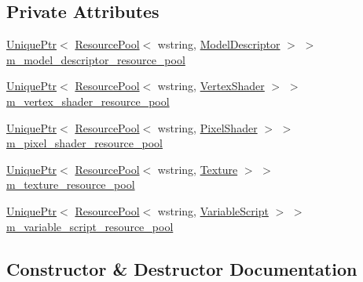 \subsection*{Private Attributes}
\begin{DoxyCompactItemize}
\item 
\hyperlink{namespacemage_a8c307fbcc33bce9b7f2aa4c26c3b95cf}{Unique\+Ptr}$<$ \hyperlink{classmage_1_1_resource_pool}{Resource\+Pool}$<$ wstring, \hyperlink{classmage_1_1_model_descriptor}{Model\+Descriptor} $>$ $>$ \hyperlink{classmage_1_1_resource_factory_a1739407c8918b375e7feaa2240628bde}{m\+\_\+model\+\_\+descriptor\+\_\+resource\+\_\+pool}
\item 
\hyperlink{namespacemage_a8c307fbcc33bce9b7f2aa4c26c3b95cf}{Unique\+Ptr}$<$ \hyperlink{classmage_1_1_resource_pool}{Resource\+Pool}$<$ wstring, \hyperlink{classmage_1_1_vertex_shader}{Vertex\+Shader} $>$ $>$ \hyperlink{classmage_1_1_resource_factory_a9f961cc4c47821c9fadbac05b9b88c07}{m\+\_\+vertex\+\_\+shader\+\_\+resource\+\_\+pool}
\item 
\hyperlink{namespacemage_a8c307fbcc33bce9b7f2aa4c26c3b95cf}{Unique\+Ptr}$<$ \hyperlink{classmage_1_1_resource_pool}{Resource\+Pool}$<$ wstring, \hyperlink{classmage_1_1_pixel_shader}{Pixel\+Shader} $>$ $>$ \hyperlink{classmage_1_1_resource_factory_a987af631d0fda02fd336ceb02113a128}{m\+\_\+pixel\+\_\+shader\+\_\+resource\+\_\+pool}
\item 
\hyperlink{namespacemage_a8c307fbcc33bce9b7f2aa4c26c3b95cf}{Unique\+Ptr}$<$ \hyperlink{classmage_1_1_resource_pool}{Resource\+Pool}$<$ wstring, \hyperlink{classmage_1_1_texture}{Texture} $>$ $>$ \hyperlink{classmage_1_1_resource_factory_a0bb6251c64ac1f5e9de04968f9d78e57}{m\+\_\+texture\+\_\+resource\+\_\+pool}
\item 
\hyperlink{namespacemage_a8c307fbcc33bce9b7f2aa4c26c3b95cf}{Unique\+Ptr}$<$ \hyperlink{classmage_1_1_resource_pool}{Resource\+Pool}$<$ wstring, \hyperlink{classmage_1_1_variable_script}{Variable\+Script} $>$ $>$ \hyperlink{classmage_1_1_resource_factory_a78b0848a3aa92c338d2bc209996dd649}{m\+\_\+variable\+\_\+script\+\_\+resource\+\_\+pool}
\end{DoxyCompactItemize}


\subsection{Constructor \& Destructor Documentation}
\hypertarget{classmage_1_1_resource_factory_a340bde81096427e319b60063ae771a0d}{}\label{classmage_1_1_resource_factory_a340bde81096427e319b60063ae771a0d} 
